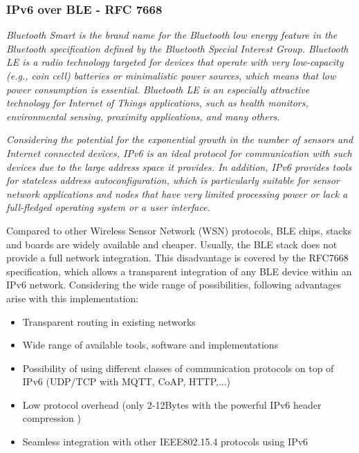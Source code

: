 \documentclass[]{scrreprt}%
\begin{document}
\subsubsection{IPv6 over BLE - RFC 7668} \label{sec:rfc7668}

\textit{
   Bluetooth Smart is the brand name for the Bluetooth low energy
   feature in the Bluetooth specification
   defined by the Bluetooth Special Interest Group.
   Bluetooth LE is a radio technology targeted for devices that operate
   with very low-capacity (e.g., coin cell) batteries or minimalistic
   power sources, which means that low power consumption is essential.
   Bluetooth LE is an especially attractive technology for Internet of
   Things applications, such as health monitors, environmental sensing,
   proximity applications, and many others.}

   \textit{
   Considering the potential for the exponential growth in the number of
   sensors and Internet connected devices, IPv6 is an ideal protocol for
   communication with such devices due to the large address space it
   provides.  In addition, IPv6 provides tools for stateless address
   autoconfiguration, which is particularly suitable for sensor network
   applications and nodes that have very limited processing power or
   lack a full-fledged operating system or a user interface.} 
\cite{RFC7668}


Compared to other Wireless Sensor Network (WSN) protocols, BLE chips, stacks and boards are widely available and cheaper.
Usually, the BLE stack does not provide a full network integration.
This disadvantage is covered by the RFC7668 specification, which allows a transparent integration of any BLE device within
an IPv6 network.
Considering the wide range of possibilities, following advantages arise with this implementation:

\begin{itemize}
  \item Transparent routing in existing networks
  \item Wide range of available tools, software and implementations
  \item Possibility of using different classes of communication protocols on top of IPv6 (UDP/TCP with MQTT, CoAP, HTTP,...)
  \item Low protocol overhead (only 2-12Bytes with the powerful IPv6 header compression \cite{RFC6282})
  \item Seamless integration with other IEEE802.15.4 protocols using IPv6
\end{itemize}
\end{document}
